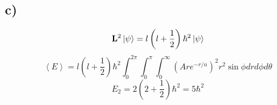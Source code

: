 \documentclass[english]{article}
\begin{document}
\subsection*{c)}
$$\vb{L}^2\ket{\psi}=l\left(l+\frac{1}{2}\right)\hbar^2\ket{\psi}$$
$$\left\langle E\right\rangle=l\left(l+\frac{1}{2}\right)\hbar^2\int_0^{2\pi}\int_0^{\pi}\int_0^{\infty}\left(Are^{-r/a}\right)^2r^2\sin\phi drd\phi d\theta$$
$$E_2=2\left(2+\frac{1}{2}\right)\hbar^2=5\hbar^2$$
\begin{comment}
$$E_n=-\frac{13.6eV}{n^2}$$
$$\mu=\frac{0.511MeV}{c^2}$$
$$-\frac{e^4\mu}{2\hbar^2}=-\frac{e^4 0.511MeV}{2\hbar^2c^2}$$
$$-\frac{e^4\mu}{2\hbar^2}=-\frac{e^4 0.511MeV}{2(6.58\cdot10^{-16})^2 (3\cdot10^8)^2}\approx-3.58\cdot10^{-20}$$
$$\left\langle E\right\rangle=\int_0^{2\pi}\int_0^{\pi}\int_0^{\infty}\left(Are^{-r/a}\right)^2r^2\sin\phi drd\phi d\theta$$
\end{comment}
\end{document}
